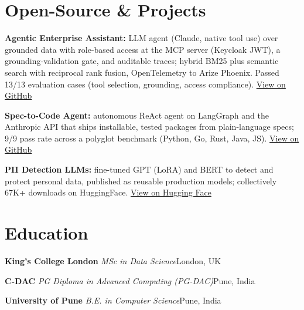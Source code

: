 \documentclass[10pt,a4paper]{article}
\newcommand{\sep}{\,\textcolor{accent!60}{\textbar}\,}
\begin{document}
\section{Open-Source \& Projects}
\begin{tight}
  \item \textbf{Agentic Enterprise Assistant:} LLM agent (Claude, native tool use) over grounded data with role-based access at the MCP server (Keycloak JWT), a grounding-validation gate, and auditable traces; hybrid BM25 plus semantic search with reciprocal rank fusion, OpenTelemetry to Arize Phoenix. Passed 13/13 evaluation cases (tool selection, grounding, access compliance). \href{https://github.com/abhijeetscode/Agentic-Enterprise-Assistant}{View on GitHub}
  \item \textbf{Spec-to-Code Agent:} autonomous ReAct agent on LangGraph and the Anthropic API that ships installable, tested packages from plain-language specs; 9/9 pass rate across a polyglot benchmark (Python, Go, Rust, Java, JS). \href{https://github.com/abhijeetscode/Spec-to-Code-Agent}{View on GitHub}
  \item \textbf{PII Detection LLMs:} fine-tuned GPT (LoRA) and BERT to detect and protect personal data, published as reusable production models; collectively 67K+ downloads on HuggingFace. \href{https://huggingface.co/ab-ai/pii_model}{View on Hugging Face}
\end{tight}

\section{Education}
{\color{company}\bfseries King's College London}\sep{\itshape MSc in Data Science}\hfill {\color{muted}London, UK}\par\vspace{1pt}
{\color{company}\bfseries C-DAC}\sep{\itshape PG Diploma in Advanced Computing (PG-DAC)}\hfill {\color{muted}Pune, India}\par\vspace{1pt}
{\color{company}\bfseries University of Pune}\sep{\itshape B.E. in Computer Science}\hfill {\color{muted}Pune, India}\par
\end{document}

